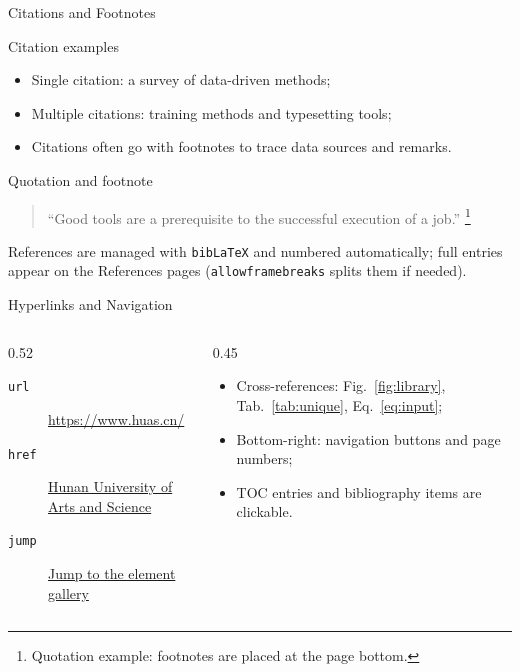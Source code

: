 \begin{frame}{Citations and Footnotes}
  \begin{block}{Citation examples}
    \begin{itemize}
      \item Single citation: a survey of data-driven methods\cite{zhang2023};
      \item Multiple citations: training methods and typesetting
        tools\cite{chen2022,li2020};
      \item Citations often go with footnotes to trace data sources and
        remarks\cite{wang2021,gao2024}.
    \end{itemize}
  \end{block}
  \begin{exampleblock}{Quotation and footnote}
    \begin{quote}\small
      ``Good tools are a prerequisite to the successful execution of a job.''%
      \footnote{Quotation example: footnotes are placed at the page bottom.}
    \end{quote}
  \end{exampleblock}
  {\small References are managed with \texttt{bib\LaTeX} and numbered
    automatically; full entries appear on the References pages
    (\texttt{allowframebreaks} splits them if needed).}
\end{frame}

\begin{frame}{Hyperlinks and Navigation}
  \begin{columns}[T]
    \begin{column}{0.52\textwidth}
      \small
      \begin{description}
        \item[\texttt{url}] \url{https://www.huas.cn/}
        \item[\texttt{href}] \href{https://www.huas.cn/}{Hunan University of Arts and Science}
        \item[\texttt{jump}] \hyperlink{frame:gallery}{Jump to the element gallery}
      \end{description}
    \end{column}
    \begin{column}{0.45\textwidth}
      \small
      \begin{itemize}
        \item Cross-references: Fig.~\ref{fig:library},
          Tab.~\ref{tab:unique}, Eq.~\eqref{eq:input};
        \item Bottom-right: navigation buttons and page numbers;
        \item TOC entries and bibliography items are clickable.
      \end{itemize}
    \end{column}
  \end{columns}
\end{frame}

